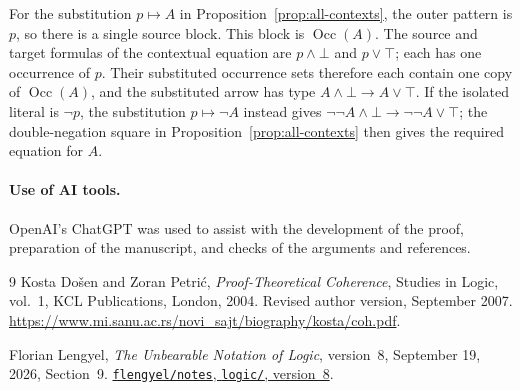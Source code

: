 \documentclass[11pt]{article}
\newcommand{\Occ}{\operatorname{Occ}}
\begin{document}
For the substitution $p\mapsto A$ in
Proposition~\ref{prop:all-contexts}, the outer pattern is $p$,
so there is a single source block. This block is $\Occ(A)$.
The source and target formulas of the contextual equation are
$p\wedge\bot$ and $p\vee\top$; each has one occurrence of $p$. Their substituted occurrence sets therefore each
contain one copy of $\Occ(A)$, and the substituted arrow has type
$A\wedge\bot\to A\vee\top$. If the isolated literal is $\neg p$,
the substitution $p\mapsto\neg A$ instead gives
$\neg\neg A\wedge\bot\to\neg\neg A\vee\top$; the
double-negation square in Proposition~\ref{prop:all-contexts}
then gives the required equation for $A$.

\paragraph{Use of AI tools.}
OpenAI's ChatGPT was used to assist with the development of the proof,
preparation of the manuscript, and checks of the arguments and references.

\begin{thebibliography}{9}
\small
\setlength{\itemsep}{2pt}
\setlength{\parskip}{0pt}
Kosta Do\v{s}en and Zoran Petri\'c,
\emph{Proof-Theoretical Coherence},
Studies in Logic, vol.~1, KCL Publications, London, 2004.
Revised author version, September 2007.
\url{https://www.mi.sanu.ac.rs/novi_sajt/biography/kosta/coh.pdf}.

Florian Lengyel,
\emph{The Unbearable Notation of Logic},
version~8, September 19, 2026, Section~9.
\href{https://github.com/flengyel/notes/blob/a89f60bfd36f0141dee879681faa43a23e6cf321/logic/The-Unbearable-Notation-of-Logic_v8.pdf}{\texttt{flengyel/notes}, \texttt{logic/}, version~8}.
\end{thebibliography}
\end{document}
